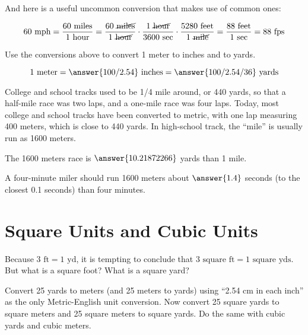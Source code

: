 \documentclass[nooutcomes]{ximera}
\begin{document}
And here is a useful uncommon conversion that makes use of common ones: 

\[
60 \textrm{ mph} = \frac{60\textrm{ miles}}{1\textrm{ hour}} 
=  \frac{60\textrm{ \cancel{miles}}}{1\textrm{ \cancel{hour}}} \cdot \frac{1\textrm{ \cancel{hour}}}{3600\textrm{ sec}} \cdot 
\frac{5280\textrm{ feet}}{{1\textrm{ \cancel{mile}}}} = \frac{88\textrm{ feet}}{1\textrm{ sec}} = 88 \textrm{ fps}
\]

\begin{question}
Use the conversions above to convert 1 meter to inches and to yards. 

\[
1\textrm{ meter} = \answer{100/2.54}\textrm{ inches} = \answer{100/2.54/36} \textrm{ yards}
\] 

\end{question}

\begin{question}
College and school tracks used to be 1/4 mile around, or 440 yards, so that a half-mile race was two laps, and a one-mile race was four laps.  Today, most college and school tracks have been converted to metric, with one lap measuring 400 meters, which is close to 440 yards.  In high-school track, the ``mile'' is usually run as 1600 meters.  

The 1600 meters race is $\answer{10.21872266}$ yards  than 1 mile.  

A four-minute miler should run 1600 meters about $\answer{1.4}$ seconds (to the closest 0.1 seconds)   than four minutes.  
\end{question}


\section{Square Units and Cubic Units}
Because $3\textrm{ ft} = 1 \textrm{ yd}$, it is tempting to conclude that $3\textrm{ square ft} = 1 \textrm{ square yds}$.  But what is a square foot?  What is a square yard?  




\begin{problem}
Convert 25 yards to meters (and 25 meters to yards) using ``2.54 cm in each inch'' as the only Metric-English unit conversion.  Now convert 25 square yards to square meters and 25 square meters to square yards.  Do the same with cubic yards and cubic meters.
\end{problem}
\end{document}
